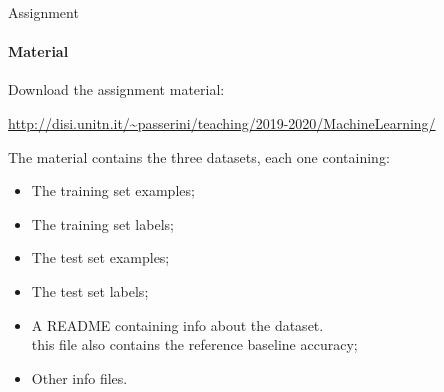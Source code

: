 \documentclass{beamer}
\begin{document}

\begin{frame}{Assignment}
\framesubtitle{Material}
Download the assignment material:

{\scriptsize \url{http://disi.unitn.it/~passerini/teaching/2019-2020/MachineLearning/}}

The material contains the three datasets, each one containing:
    \begin{itemize}
    \item The training set examples;
    \item The training set labels;
    \item The test set examples;
    \item The test set labels;
    \item A README containing info about the dataset. \\ this file also contains
          the reference baseline accuracy;
    \item Other info files.
    \end{itemize}

\end{frame}


%
%
%
%
%

\end{document}
